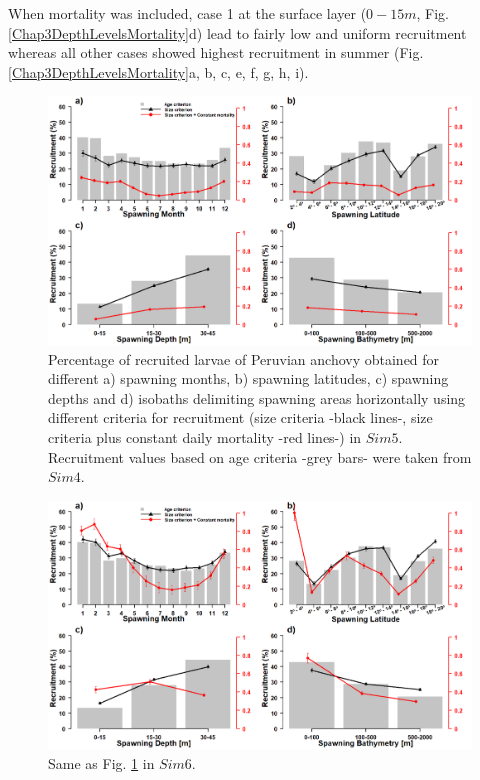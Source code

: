 When mortality was included, case 1 at the surface layer ($0 - 15 m$, Fig. \ref{Chap3DepthLevelsMortality}d) lead to fairly low and uniform recruitment whereas all other cases showed highest recruitment in summer (Fig. \ref{Chap3DepthLevelsMortality}a, b, c, e, f, g, h, i).\\

\begin{figure}[H]
	\includegraphics[width=1.0\textwidth]{figures/Chap3Case1CriterionCompar.png}
	\centering
	\caption{Percentage of recruited larvae of Peruvian anchovy obtained for different a) spawning months, b) spawning latitudes, c) spawning depths and d) isobaths delimiting spawning areas horizontally using different criteria for recruitment (size criteria -black lines-, size criteria plus constant daily mortality -red lines-) in $Sim 5$. Recruitment values based on age criteria -grey bars- were taken from $Sim 4$.}
	\label{Chap3Case1CriterionCompar}
\end{figure}

\begin{figure}[H]
	\includegraphics[width=1.0\textwidth]{figures/Chap3Case2CriterionCompar.png}
	\centering
	\caption{Same as Fig. \ref{Chap3Case1CriterionCompar} in $Sim 6$.}
	\label{Chap3Case2CriterionCompar}
\end{figure}

